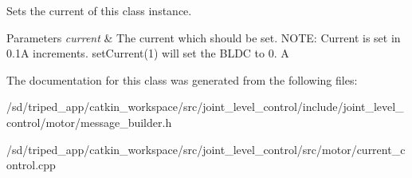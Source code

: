 Sets the current of this class instance. 
\begin{DoxyParams}{Parameters}
{\em current} & The current which should be set. N\+O\+TE\+: Current is set in 0.\+1A increments. set\+Current(1) will set the B\+L\+DC to 0. A \\
\hline
\end{DoxyParams}


The documentation for this class was generated from the following files\+:\begin{DoxyCompactItemize}
\item 
/sd/triped\+\_\+app/catkin\+\_\+workspace/src/joint\+\_\+level\+\_\+control/include/joint\+\_\+level\+\_\+control/motor/message\+\_\+builder.\+h\item 
/sd/triped\+\_\+app/catkin\+\_\+workspace/src/joint\+\_\+level\+\_\+control/src/motor/current\+\_\+control.\+cpp\end{DoxyCompactItemize}
